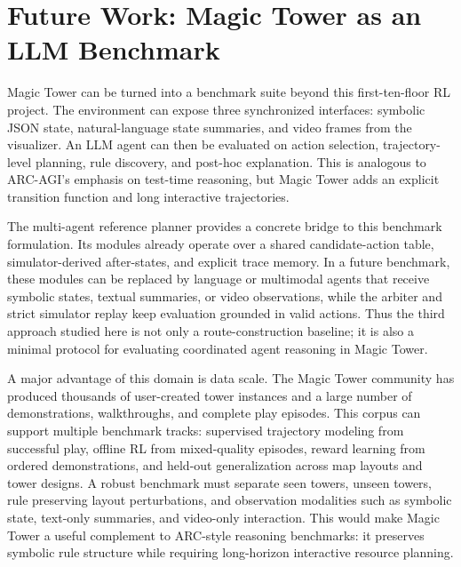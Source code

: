 \documentclass{article}
\begin{document}
\section{Future Work: Magic Tower as an LLM Benchmark}
Magic Tower can be turned into a benchmark suite beyond this first-ten-floor
RL project.  The environment can expose three synchronized interfaces: symbolic
JSON state, natural-language state summaries, and video frames from the
visualizer.  An LLM agent can then be evaluated on action selection,
trajectory-level planning, rule discovery, and post-hoc explanation.  This is
analogous to ARC-AGI's emphasis on test-time reasoning, but Magic Tower adds an
explicit transition function and long interactive trajectories.

The multi-agent reference planner provides a concrete bridge to this benchmark
formulation.  Its modules already operate over a shared candidate-action table,
simulator-derived after-states, and explicit trace memory.  In a future
benchmark, these modules can be replaced by language or multimodal agents that
receive symbolic states, textual summaries, or video observations, while the
arbiter and strict simulator replay keep evaluation grounded in valid actions.
Thus the third approach studied here is not only a route-construction baseline;
it is also a minimal protocol for evaluating coordinated agent reasoning in
Magic Tower.

A major advantage of this domain is data scale.  The Magic Tower community has
produced thousands of user-created tower instances and a large number of
demonstrations, walkthroughs, and complete play episodes.  This corpus can
support multiple benchmark tracks: supervised trajectory modeling from
successful play, offline RL from mixed-quality episodes, reward learning from
ordered demonstrations, and held-out generalization across map layouts and tower
designs.  A robust benchmark must separate seen towers, unseen towers, rule
preserving layout perturbations, and observation modalities such as symbolic
state, text-only summaries, and video-only interaction.  This would make Magic
Tower a useful complement to ARC-style reasoning benchmarks: it preserves
symbolic rule structure while requiring long-horizon interactive resource
planning.
\end{document}
